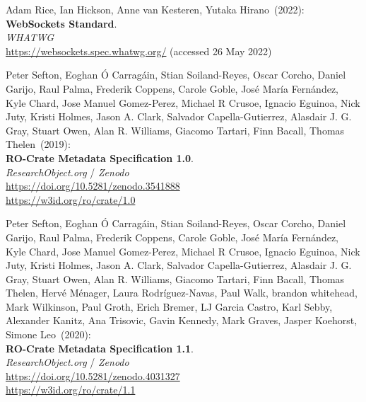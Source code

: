\begin{thebibliography}{9}
Adam Rice, Ian Hickson, Anne van Kesteren, Yutaka Hirano~(2022): \\
\textbf{WebSockets Standard}. \\
\emph{WHATWG}\\
\url{https://websockets.spec.whatwg.org/}
(accessed 26 May 2022)

Peter Sefton, Eoghan Ó Carragáin, Stian Soiland-Reyes, Oscar Corcho, Daniel Garijo, Raul Palma, Frederik Coppens, Carole Goble, José María Fernández, Kyle Chard, Jose Manuel Gomez-Perez, Michael R Crusoe, Ignacio Eguinoa, Nick Juty, Kristi Holmes, Jason A. Clark, Salvador Capella-Gutierrez, Alasdair J. G. Gray, Stuart Owen, Alan R. Williams, Giacomo Tartari, Finn Bacall, Thomas Thelen~(2019): \\
\textbf{RO-Crate Metadata Specification 1.0}.\\
\emph{ResearchObject.org} / \emph{Zenodo}\\
\url{https://doi.org/10.5281/zenodo.3541888}\\
\url{https://w3id.org/ro/crate/1.0}

Peter Sefton, Eoghan Ó Carragáin, Stian Soiland-Reyes, Oscar Corcho, Daniel Garijo, Raul Palma, Frederik Coppens, Carole Goble, José María Fernández, Kyle Chard, Jose Manuel Gomez-Perez, Michael R Crusoe, Ignacio Eguinoa, Nick Juty, Kristi Holmes, Jason A. Clark, Salvador Capella-Gutierrez, Alasdair J. G. Gray, Stuart Owen, Alan R. Williams, Giacomo Tartari, Finn Bacall, Thomas Thelen, Hervé Ménager, Laura Rodríguez-Navas, Paul Walk, brandon whitehead, Mark Wilkinson, Paul Groth, Erich Bremer, LJ Garcia Castro, Karl Sebby, Alexander Kanitz, Ana Trisovic, Gavin Kennedy, Mark Graves, Jasper Koehorst, Simone Leo~(2020): \\
\textbf{RO-Crate Metadata Specification 1.1}.\\
\emph{ResearchObject.org} / \emph{Zenodo}\\
\url{https://doi.org/10.5281/zenodo.4031327}\\
\url{https://w3id.org/ro/crate/1.1}


\end{thebibliography}
